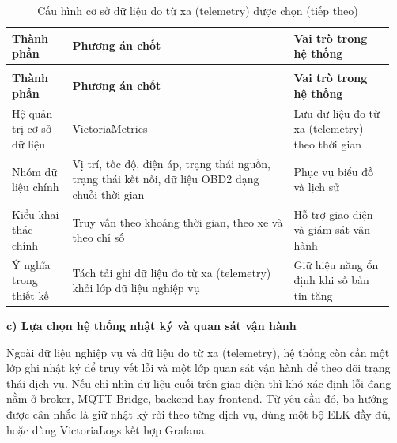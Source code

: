 \documentclass[a4paper]{extarticle}
\newcommand{\thesissettableid}[2]{%
  \renewcommand{\thetable}{#1}%
  \renewcommand{\theHtable}{#2}%
}
\begin{document}
{\thesissettableid{3.28}{condensed-bang-3-28-cau-hinh-co-so-du-lieu-do-tu-xa-telemetry-duoc-chon}
\def\LTcaptype{table}
\begin{longtable}{|L{0.153\linewidth}|L{0.553\linewidth}|L{0.253\linewidth}|}
\caption{Cấu hình cơ sở dữ liệu đo từ xa (telemetry) được chọn}\label{tab:condensed-bang-3-28-cau-hinh-co-so-du-lieu-do-tu-xa-telemetry-duoc-chon}\\
\hline
\textbf{Thành phần} & \textbf{Phương án chốt} & \textbf{Vai trò trong hệ thống} \\
\hline
\endfirsthead
\caption[]{Cấu hình cơ sở dữ liệu đo từ xa (telemetry) được chọn (tiếp theo)}\\
\hline
\textbf{Thành phần} & \textbf{Phương án chốt} & \textbf{Vai trò trong hệ thống} \\
\hline
\endhead
\endfoot
\endlastfoot
Hệ quản trị cơ sở dữ liệu & VictoriaMetrics & Lưu dữ liệu đo từ xa (telemetry) theo thời gian \\\hline
Nhóm dữ liệu chính & Vị trí, tốc độ, điện áp, trạng thái nguồn, trạng thái kết nối, dữ liệu OBD2 dạng chuỗi thời gian & Phục vụ biểu đồ và lịch sử \\\hline
Kiểu khai thác chính & Truy vấn theo khoảng thời gian, theo xe và theo chỉ số & Hỗ trợ giao diện và giám sát vận hành \\\hline
Ý nghĩa trong thiết kế & Tách tải ghi dữ liệu đo từ xa (telemetry) khỏi lớp dữ liệu nghiệp vụ & Giữ hiệu năng ổn định khi số bản tin tăng \\\hline
\end{longtable}
}

\textbf{c) Lựa chọn hệ thống nhật ký và quan sát vận hành}

Ngoài dữ liệu nghiệp vụ và dữ liệu đo từ xa (telemetry), hệ thống còn cần một lớp ghi nhật ký
để truy vết lỗi và một lớp quan sát vận hành để theo dõi trạng thái dịch vụ.
Nếu chỉ nhìn dữ liệu cuối trên giao diện thì khó xác định lỗi đang nằm ở broker,
MQTT Bridge, backend hay frontend. Từ yêu cầu đó, ba hướng được cân nhắc là
giữ nhật ký rời theo từng dịch vụ, dùng một bộ ELK đầy đủ, hoặc dùng VictoriaLogs
kết hợp Grafana.
\end{document}

